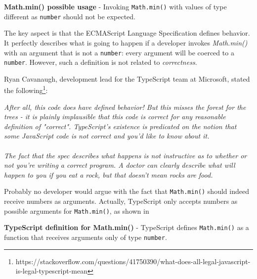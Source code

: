 \begin{code}
  \captionsetup{aboveskip=0pt, belowskip=10pt}
  \caption[Math.min() possible usage]{\textbf{Math.min() possible usage} - Invoking \texttt{Math.min()} with values of type different as \texttt{number} should not be expected.}
  \label{code:type-inference-multiply-probably-incorrect}
\end{code}

The key aspect is that the ECMAScript Language Specification defines behavior. It perfectly describes what is going to happen if a developer invokes \textit{Math.min()} with an argument that is not a \texttt{number}: every argument will be coerced to a \texttt{number}. However, such a definition is not related to \textit{correctness}.

Ryan Cavanaugh, development lead for the TypeScript team at Microsoft, stated the following\footnote{https://stackoverflow.com/questions/41750390/what-does-all-legal-javascript-is-legal-typescript-mean}:

\begin{displayquote}
  \textit{After all, this code does have defined behavior! But this misses the forest for the trees - it is plainly implausible that this code is correct for any reasonable definition of "correct". TypeScript's existence is predicated on the notion that some JavaScript code is not correct and you'd like to know about it.}
  \\
  \\
  \textit{The fact that the spec describes what happens is not instructive as to whether or not you're writing a correct program. A doctor can clearly describe what will happen to you if you eat a rock, but that doesn't mean rocks are food.}
\end{displayquote}

Probably no developer would argue with the fact that \texttt{Math.min()} should indeed receive numbers as arguments. Actually, TypeScript only accepts numbers as possible arguments for \texttt{Math.min()}, as shown in \

\begin{code}
  \captionsetup{aboveskip=0pt, belowskip=10pt}
  \caption[TypeScript definition for Math.min()]{\textbf{TypeScript definition for Math.min()} - TypeScript defines \texttt{Math.min()} as a function that receives arguments only of type \texttt{number}.}
  \label{code:type-inference-math-min-typescript-definition}
\end{code}

